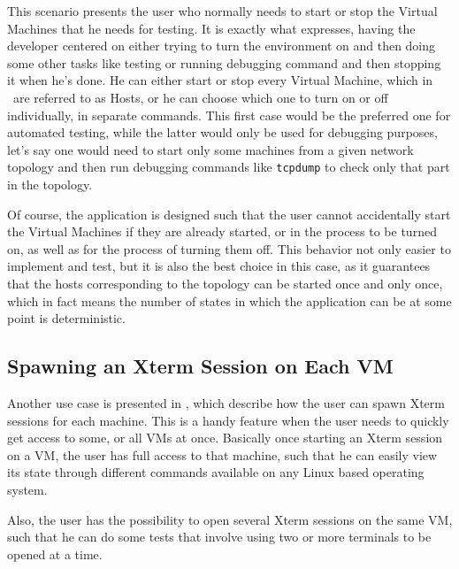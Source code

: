 This scenario presents the user who normally needs to start or stop the Virtual Machines that he needs for testing.
It is exactly what  expresses, having the developer centered on either trying to turn the environment on and then doing some other tasks like testing or running debugging command and then stopping it when he's done.
He can either start or stop every Virtual Machine, which in \project\ are referred to as Hosts, or he can choose which one to turn on or off individually, in separate commands.
This first case would be the preferred one for automated testing, while the latter would only be used for debugging purposes, let's say one would need to start only some machines from a given network topology and then run debugging commands like \texttt{tcpdump} to check only that part in the topology.

Of course, the application is designed such that the user cannot accidentally start the Virtual Machines if they are already started, or in the process to be turned on, as well as for the process of turning them off.
This behavior not only easier to implement and test, but it is also the best choice in this case, as it guarantees that the hosts corresponding to the topology can be started once and only once, which in fact means the number of states in which the application can be at some point is deterministic.

\subsection{Spawning an Xterm Session on Each VM}
\label{sub-sec:spawn-xterm}


Another use case is presented in , which describe how the user can spawn Xterm sessions for each machine.
This is a handy feature when the user needs to quickly get access to some, or all VMs at once.
Basically once starting an Xterm session on a VM, the user has full access to that machine, such that he can easily view its state through different commands available on any Linux based operating system.

Also, the user has the possibility to open several Xterm sessions on the same VM, such that he can do some tests that involve using two or more terminals to be opened at a time.

